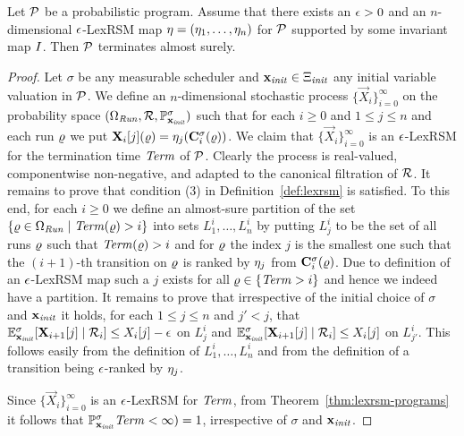 \begin{theorem}
\label{thm:lexrsm-programs}
Let $\mathcal{P}$ be a probabilistic program. Assume that there exists an $\epsilon>0$ 
and an $n$-dimensional $\epsilon$-LexRSM map $\mathbf{\eta}=(\eta_1,\dots,\eta_n)$ for 
$\mathcal{P}$ supported 
by some 
invariant map $I$. 
Then $\mathcal{P}$ terminates almost surely.
\end{theorem}
\begin{proof}
Let $\sigma$ be any measurable scheduler and $\mathbf{x}_{\mathit{init}}\in\Xi_{\mathit{init}}$ any 
initial variable valuation in $\mathcal{P}$.
We define an $n$-dimensional stochastic process 
$\{\vec{X}_{i}\}_{i=0}^{\infty} $ on the probability space 
$(\Omega_{\mathit{Run}},\mathcal{R},\mathbb{P}^{\sigma}_{\mathbf{x}_{\mathit{init}}})$ such 
that for each 
$i\geq 0$ and $1\leq j 
\leq n$ and each run $\varrho$ we put $\mathbf{X}_{i}[j](\varrho) = 
\eta_j(\mathbf{C}^{\sigma}_{i}(\varrho))$. We claim that $\{\vec{X}_{i}\}_{i=0}^{\infty}$ 
is an $\epsilon$-LexRSM for the termination time $\mathit{Term}$ of $\mathcal{P}$. Clearly 
the process is real-valued, componentwise non-negative, and adapted to the 
canonical filtration of $\mathcal{R}$. It remains to prove that condition (3) in 
Definition~\ref{def:lexrsm} is satisfied. To this end, for each $i\geq 0$ we 
define an almost-sure partition of the set $\{\varrho\in \Omega_{\mathit{Run}}\mid 
\mathit{Term}(\varrho) >i\}$ into sets $L^{i}_1,\dots,L^{i}_n$ by putting $L^i_j$ to be 
the set of all runs $\varrho$ such that $\mathit{Term}(\varrho)>i$ and for $\varrho$ the index 
$j$ is the smallest one such that the $(i+1)$-th transition on $\varrho$ is ranked 
by $\eta_j$ from $\mathbf{C}^{\sigma}_{i}(\varrho)$. Due to 
definition of an $\epsilon$-LexRSM map such a $j$ exists for all 
$\varrho\in\{\mathit{Term}>i\}$ and hence we indeed have a partition. It remains to prove 
that irrespective of the initial choice of $\sigma$ and $\mathbf{x}_{\mathit{init}}$ it holds, 
for each $1\leq j 
\leq n$ and $j'<j$, that $\mathbb{E}^\sigma_{\mathbf{x}_{\mathit{init}}}[\mathbf{X}_{i+1}[j]\mid 
\mathcal{R}_i]\leq X_i[j]-\epsilon $ on $L_j^i$ and 
$\mathbb{E}^\sigma_{\mathbf{x}_{\mathit{init}}}[\mathbf{X}_{i+1}[j]\mid 
\mathcal{R}_i]\leq X_i[j] $ on $L_{j'}^i$. This follows easily from 
the definition of $L^{i}_1,\dots,L^{i}_n$ and from the definition of a 
transition being $\epsilon$-ranked by $\eta_j$.

Since  $\{\vec{X}_{i}\}_{i=0}^{\infty}$ 
is an $\epsilon$-LexRSM for $\mathit{Term}$, from Theorem~\ref{thm:lexrsm-programs} it 
follows that $\mathbb{P}^{\sigma}_{\mathbf{x}_{\mathit{init}}}\mathit{Term} <\infty) =1$, irrespective of 
$\sigma$ and $\mathbf{x}_{\mathit{init}}$.
\end{proof} 

